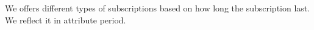 
We offers different types of subscriptions based on how long the subscription last. We reflect it in attribute period.
